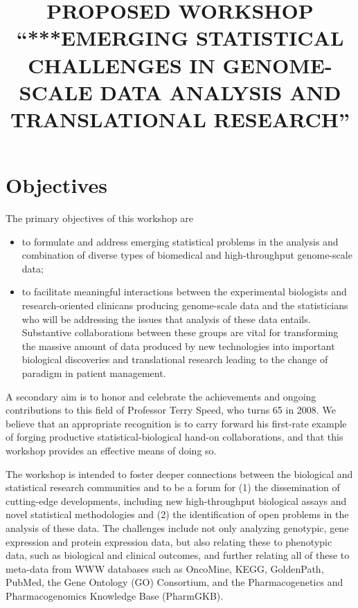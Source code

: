 \documentclass[12pt]{amsart}
\title{PROPOSED WORKSHOP ``***EMERGING STATISTICAL CHALLENGES IN GENOME-SCALE DATA ANALYSIS AND TRANSLATIONAL RESEARCH''}
\begin{document}
\maketitle

\section*{Objectives}
The primary objectives of this workshop are

\begin{itemize}
\item to formulate and address emerging statistical problems
in the analysis and combination of diverse types 
of biomedical and high-throughput genome-scale data;

\item to facilitate meaningful interactions
between the experimental biologists and research-oriented clinicans producing genome-scale data 
and the statisticians who will be addressing the issues 
that analysis of these data entails. 
Substantive collaborations between these groups are
vital for transforming the massive amount of data produced by new
technologies into important biological discoveries and translational research leading to the change of paradigm in patient management. 
\end{itemize}

A secondary aim is to honor and celebrate the achievements and ongoing 
contributions to this field of Professor Terry Speed, 
who turns 65 in 2008.
We believe that an appropriate recognition is 
to carry forward his first-rate example of forging productive 
statistical-biological hand-on collaborations,
and that this workshop provides an effective means of doing so.

The workshop is intended to foster deeper connections between the 
biological and statistical research communities and to be a forum for 
(1) the dissemination of cutting-edge developments, including new
high-throughput biological assays and novel statistical methodologies
and (2) the identification of open problems in the analysis of these data.
The challenges include not only analyzing
genotypic, gene expression and protein expression data, 
but also relating these to phenotypic data,
such as biological and clinical outcomes, and further relating
all of these to meta-data from WWW databases such as OncoMine, KEGG, GoldenPath, PubMed, 
the Gene Ontology (GO) Consortium, 
and the Pharmacogenetics and Pharmacogenomics Knowledge Base (PharmGKB). 
\end{document}
